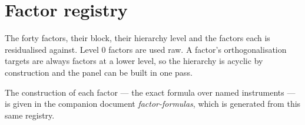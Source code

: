 \newpage
\section{Factor registry}
\label{app:registry}

The forty factors, their block, their hierarchy level and the factors each is
residualised against. Level 0 factors are used raw. A factor's orthogonalisation
targets are always factors at a lower level, so the hierarchy is acyclic by
construction and the panel can be built in one pass.

The construction of each factor --- the exact formula over named instruments --- is
given in the companion document \emph{factor-formulas}, which is generated from this
same registry.


